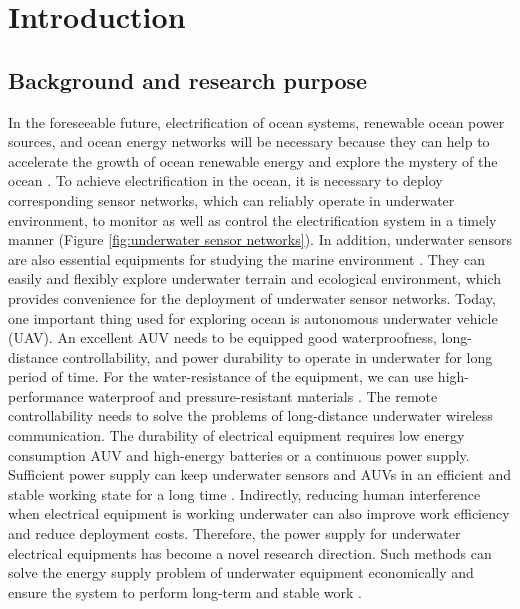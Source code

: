 \chapter{Introduction}
\section{Background and research purpose}
In the foreseeable future, electrification of ocean systems, renewable ocean power sources, and ocean energy networks will be necessary because they can help to accelerate the growth of ocean renewable energy and explore the mystery of the ocean \cite{Orekan, Randhawa2015}.
To achieve electrification in the ocean, it is necessary to deploy corresponding sensor networks, which can reliably operate in underwater environment, %
to monitor as well as control the electrification system in a timely manner (Figure \ref{fig:underwater sensor networks}).
In addition, underwater sensors are also essential equipments for studying the marine environment \cite{Heidemann2012, Wu2020}.
They can easily and flexibly explore underwater terrain and ecological environment, which provides convenience for the deployment of underwater sensor networks.
Today, one important thing used for exploring ocean is autonomous underwater vehicle (UAV).
An excellent AUV needs to be equipped good waterproofness, long-distance controllability, and power durability to operate in underwater for long period of time. For the water-resistance of the equipment, we can use high-performance waterproof and pressure-resistant materials \cite{Hwang2019, Tran2020, Bradley2001, Wynn2014}.
The remote controllability needs to solve the problems of long-distance underwater wireless communication.
The durability of electrical equipment requires low energy consumption AUV and high-energy batteries or a continuous power supply.
Sufficient power supply can keep underwater sensors and AUVs in an efficient and stable working state for a long time \cite{Jurdak2006}.
Indirectly, reducing human interference when electrical equipment is working underwater can also improve work efficiency and reduce deployment costs.
Therefore, the power supply for underwater electrical equipments has become a novel research direction.
Such methods can solve the energy supply problem of underwater equipment economically and ensure the system to perform long-term and stable work \cite{Taormina2018, Hahn2015}.

